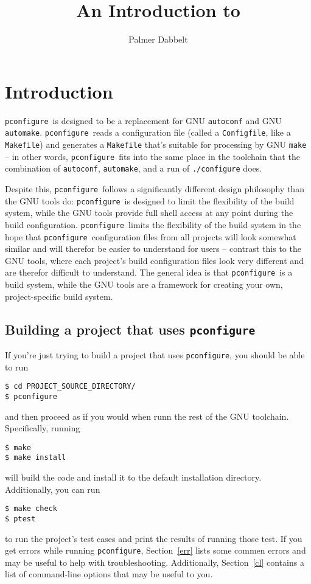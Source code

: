 \documentclass{article}
\title{An Introduction to \pconfigure}
\author{Palmer Dabbelt}
\newcommand{\pconfigure}{\texttt{pconfigure}}
\begin{document}
\maketitle
\begin{multicols}{2}
\tableofcontents
\end{multicols}
\clearpage

\section{Introduction}

\pconfigure\ is designed to be a replacement for GNU \texttt{autoconf}
and GNU \texttt{automake}.  \pconfigure\ reads a configuration file
(called a \texttt{Configfile}, like a \texttt{Makefile}) and generates
a \texttt{Makefile} that's suitable for processing by GNU
\texttt{make} -- in other words, \pconfigure\ fits into the same place
in the toolchain that the combination of \texttt{autoconf},
\texttt{automake}, and a run of \texttt{./configure} does.

Despite this, \pconfigure\ follows a significantly different design
philosophy than the GNU tools do: \pconfigure\ is designed to limit
the flexibility of the build system, while the GNU tools provide full
shell access at any point during the build configuration.
\pconfigure\ limits the flexibility of the build system in the hope
that \pconfigure\ configuration files from all projects will look
somewhat similar and will therefor be easier to understand for users
-- contrast this to the GNU tools, where each project's build
configuration files look very different and are therefor difficult to
understand.  The general idea is that \pconfigure\ is a build system,
while the GNU tools are a framework for creating your own,
project-specific build system.

\subsection{Building a project that uses \pconfigure}

If you're just trying to build a project that uses \pconfigure, you
should be able to run
\begin{verbatim}
$ cd PROJECT_SOURCE_DIRECTORY/
$ pconfigure
\end{verbatim}
and then proceed as if you would when runn the rest of the GNU
toolchain.  Specifically, running
\begin{verbatim}
$ make
$ make install
\end{verbatim}
will build the code and install it to the default installation
directory.  Additionally, you can run
\begin{verbatim}
$ make check
$ ptest
\end{verbatim}
to run the project's test cases and print the results of running those
test.  If you get errors while running \pconfigure, Section~\ref{err}
lists some commen errors and may be useful to help with
troubleshooting.  Additionally, Section~\ref{cl} contains a list of
command-line options that may be useful to you.
\end{document}
